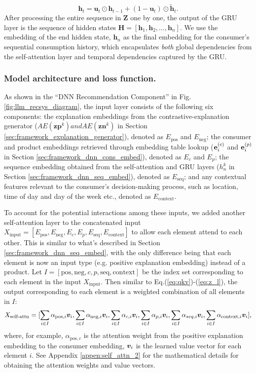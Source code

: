 \begin{equation}
\label{eq:new_hid_state}
\mathbf{h}_t = \mathbf{u}_t \odot \mathbf{h}_{t-1} + (1 - \mathbf{u}_t) \odot \tilde{\mathbf{h}}_t.
\end{equation}
After processing the entire sequence in \(\mathbf{Z}\) one by one, 
the output of the GRU layer is the sequence of hidden states $\mathbf{H} = [\mathbf{h}_1, \mathbf{h}_2, \dots, \mathbf{h}_n]$. We use the embedding of the end hidden state, $\mathbf{h}_n$ as the final embedding for the consumer's sequential consumption history, which encapsulates \emph{both} global dependencies from the self-attention layer and temporal dependencies captured by the GRU. 

\subsubsection{Model architecture and loss function.}
\label{sec:framework_dnn_loss}

As shown in the ``DNN Recommendation Component'' in Fig.\ref{fig:llm_recsys_diagram}, the input layer consists of the following six components: the explanation embeddings from the contrastive-explanation generator ($AE(\bm{zp}^k) and AE(\bm{zn}^k)$ in Section \ref{sec:framework_explanation_generator}), denoted as $E_{\text{pos}}$ and $E_{\text{neg}}$; the consumer and product embeddings retrieved through embedding table lookup ($\mathbf{{\bm{e}}}^{(c)}_i$ and $\mathbf{{\bm{e}}}^{(p)}_i$ in Section \ref{sec:framework_dnn_cons_embed}), denoted as $E_c$ and $E_p$; the sequence embedding obtained from the self-attention and GRU layers ($h_n^k$ in Section \ref{sec:framework_dnn_seq_embed}), denoted as $E_{\text{seq}}$; and any contextual features relevant to the consumer's decision-making process, such as location, time of day and day of the week etc., denoted as $E_{\text{context}}$. 

To account for the potential interactions among these inputs, we added another self-attention layer to the concatenated input $X_{\text{input}} = [E_{\text{pos}}, E_{\text{neg}}, E_c, E_p, E_{\text{seq}}, E_{\text{context}}]$ to allow each element attend to each other. This is similar to what's described in Section \ref{sec:framework_dnn_seq_embed}, with the only difference being that each element is now an input type (e.g. positive explanation embedding) instead of a product. Let $I = [\text{pos}, \text{neg}, c, p, \text{seq}, \text{context}]$ be the index set corresponding to each element in the input $X_{\text{input}}$. Then similar to Eq.(\ref{eq:qkv})-(\ref{eq:z_l}), the output corresponding to each element is a weighted combination of all elements in $I$:
$$
X_{\text{self-attn}} = [\sum_{i \in I} \alpha_{\text{pos}, i} {\bm{v}}_i, \sum_{i \in I} \alpha_{\text{neg}, i} {\bm{v}}_i, \sum_{i \in I} \alpha_{c, i} {\bm{v}}_i, \sum_{i \in I} \alpha_{p, i} {\bm{v}}_i, \sum_{i \in I} \alpha_{seq, i} {\bm{v}}_i, \sum_{i \in I} \alpha_{\text{context}, i} {\bm{v}}_i],
$$
where, for example, $\alpha_{\text{pos}, c}$ is the attention weight from the positive explanation embedding to the consumer embedding, ${\bm{v}}_i$ is the learned value vector for each element $i$. See Appendix \ref{appen:self_attn_2} for the mathematical details for obtaining the attention weights and value vectors. 

